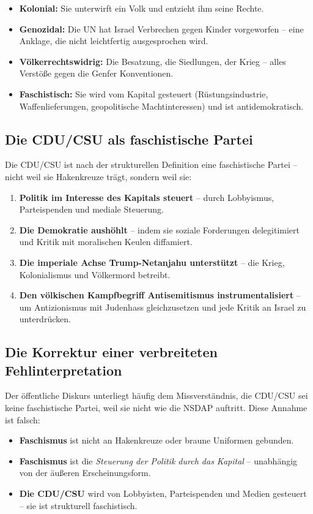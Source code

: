 \begin{itemize}
    \item \textbf{Kolonial:} Sie unterwirft ein Volk und entzieht ihm seine Rechte.
    \item \textbf{Genozidal:} Die UN hat Israel Verbrechen gegen Kinder vorgeworfen – eine Anklage, die nicht leichtfertig ausgesprochen wird.
    \item \textbf{Völkerrechtswidrig:} Die Besatzung, die Siedlungen, der Krieg – alles Verstöße gegen die Genfer Konventionen.
    \item \textbf{Faschistisch:} Sie wird vom Kapital gesteuert (Rüstungsindustrie, Waffenlieferungen, geopolitische Machtinteressen) und ist antidemokratisch.
\end{itemize}

\subsection{Die CDU/CSU als faschistische Partei}

Die CDU/CSU ist nach der strukturellen Definition eine faschistische Partei – nicht weil sie Hakenkreuze trägt, sondern weil sie:

\begin{enumerate}
    \item \textbf{Politik im Interesse des Kapitals steuert} – durch Lobbyismus, Parteispenden und mediale Steuerung.
    \item \textbf{Die Demokratie aushöhlt} – indem sie soziale Forderungen delegitimiert und Kritik mit moralischen Keulen diffamiert.
    \item \textbf{Die imperiale Achse Trump-Netanjahu unterstützt} – die Krieg, Kolonialismus und Völkermord betreibt.
    \item \textbf{Den völkischen Kampfbegriff Antisemitismus instrumentalisiert} – um Antizionismus mit Judenhass gleichzusetzen und jede Kritik an Israel zu unterdrücken.
\end{enumerate}

\subsection{Die Korrektur einer verbreiteten Fehlinterpretation}

Der öffentliche Diskurs unterliegt häufig dem Missverständnis, die CDU/CSU sei keine faschistische Partei, weil sie nicht wie die NSDAP auftritt. Diese Annahme ist falsch:

\begin{itemize}
    \item \textbf{Faschismus} ist nicht an Hakenkreuze oder braune Uniformen gebunden.
    \item \textbf{Faschismus} ist die \emph{Steuerung der Politik durch das Kapital} – unabhängig von der äußeren Erscheinungsform.
    \item \textbf{Die CDU/CSU} wird von Lobbyisten, Parteispenden und Medien gesteuert – sie ist strukturell faschistisch.
\end{itemize}

